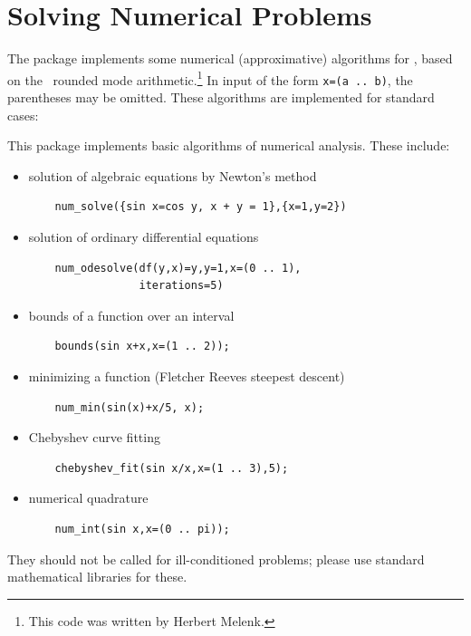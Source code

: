 
\chapter{Solving Numerical Problems}



The  package implements some numerical (approximative)
algorithms for \REDUCE, based on the \REDUCE\ rounded mode
arithmetic.\footnote{This code was written by Herbert Melenk.}
In input of the form \texttt{x=(a~..~b)}, the parentheses may be omitted.
These algorithms are implemented for standard cases:

This package implements basic algorithms of numerical analysis.
These include:
\begin{itemize}
\item solution of algebraic equations by Newton's method
\begin{verbatim}
    num_solve({sin x=cos y, x + y = 1},{x=1,y=2})
\end{verbatim}
\item solution of ordinary differential equations
\begin{verbatim}
    num_odesolve(df(y,x)=y,y=1,x=(0 .. 1),
                 iterations=5)
\end{verbatim}
\item bounds of a function over an interval
\begin{verbatim}
    bounds(sin x+x,x=(1 .. 2));
\end{verbatim}
\item minimizing a function (Fletcher Reeves steepest descent)
\begin{verbatim}
    num_min(sin(x)+x/5, x);
\end{verbatim}
\item Chebyshev curve fitting
\begin{verbatim}
    chebyshev_fit(sin x/x,x=(1 .. 3),5);
\end{verbatim}
\item numerical quadrature
\begin{verbatim}
    num_int(sin x,x=(0 .. pi));
\end{verbatim}
\end{itemize}
They should not be called for ill-conditioned problems;
please use standard mathematical libraries for
these.


